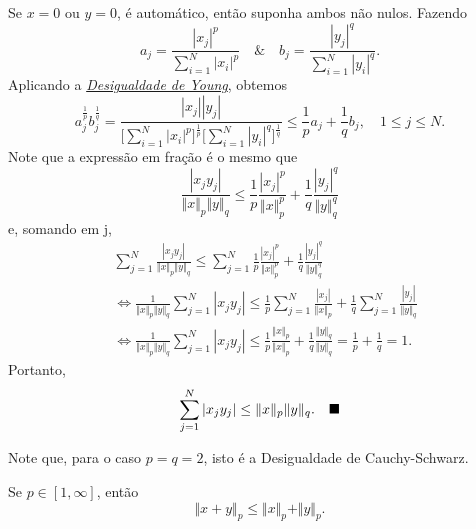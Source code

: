 \documentclass[../functional_analysis.tex]{subfiles}
\begin{document}
\begin{proof*}
	Se \(x=0\) ou \(y=0\), é automático, então suponha ambos não nulos. Fazendo
	\[
		a_{j} = \frac{|x_{j}|^{p}}{\sum\limits_{i=1}^{N}|x_{i}|^{p}} \quad\&\quad b_{j} = \frac{|y_{j}|^{q}}{\sum\limits_{i=1}^{N}|y_{i}|^{q}}.
	\]
	Aplicando a \hyperlink{young_inequality}{\textit{Desigualdade de Young}}, obtemos
	\[
		a_{j}^{\frac{1}{p}}b_{j}^{\frac{1}{q}} = \frac{|x_{j}||y_{j}|}{\biggl[\sum\limits_{i=1}^{N}|x_{i}|^{p}\biggr]^{\frac{1}{p}}\biggl[\sum\limits_{i=1}^{N}|y_{i}|^{q}\biggr]^{\frac{1}{q}}}\leq \frac{1}{p}a_{j} + \frac{1}{q}b_{j}, \quad 1\leq j\leq N.
	\]
	Note que a expressão em fração é o mesmo que
	\[
		\frac{|x_{j}y_{j}|}{\Vert x \Vert_p \Vert y \Vert_q} \leq \frac{1}{p}\frac{|x_{j}|^{p}}{\Vert x \Vert_{p}^{p}} + \frac{1}{q} \frac{|y_{j}|^{q}}{\Vert y \Vert_{q}^{q}}
	\]
	e, somando em j,
	\begin{align*}
		 & \sum\limits_{j=1}^{N}\frac{|x_{j}y_{j}|}{\Vert x \Vert_p \Vert y \Vert_q} \leq \sum\limits_{j=1}^{N} \frac{1}{p}\frac{|x_{j}|^{p}}{\Vert x \Vert_{p}^{p}} + \frac{1}{q} \frac{|y_{j}|^{q}}{\Vert y \Vert_{q}^{q}}                             \\
		 & \Longleftrightarrow \frac{1}{\Vert x \Vert_p \Vert y \Vert_q}\sum\limits_{j=1}^{N}|x_{j}y_{j}| \leq \frac{1}{p}\sum\limits_{j=1}^{N} \frac{|x_{j}|}{\Vert x \Vert_p} + \frac{1}{q} \sum\limits_{j=1}^{N} \frac{|y_{j}|}{\Vert y \Vert_q}      \\
		 & \Longleftrightarrow \frac{1}{\Vert x \Vert_p \Vert y \Vert_q}\sum\limits_{j=1}^{N}|x_{j}y_{j}| \leq \frac{1}{p}\frac{\Vert x \Vert_p}{\Vert x \Vert_p} + \frac{1}{q} \frac{\Vert y \Vert_q}{\Vert y \Vert_q} = \frac{1}{p} + \frac{1}{q} = 1.
	\end{align*}
	Portanto,
	\[
		\sum\limits_{j=1}^{N}|x_{j}y_{j}|\leq \Vert x \Vert_p \Vert y \Vert_q. \quad \text{$\blacksquare$}
	\]
\end{proof*}
Note que, para o caso \(p=q=2\), isto é a Desigualdade de Cauchy-Schwarz.
\hypertarget{minkowski_inequality}{
	\begin{lemma*}
		Se \(p\in [1, \infty]\), então
		\[
			\Vert x + y \Vert_p \leq \Vert x \Vert_p + \Vert y \Vert_p.
		\]
	\end{lemma*}
}
\end{document}
